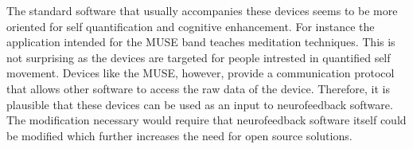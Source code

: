 The standard software that usually accompanies these devices seems to be more oriented for self quantification and cognitive enhancement. For instance the application intended for the MUSE band teaches meditation techniques. This is not surprising as the devices are targeted for people intrested in quantified self movement. Devices like the MUSE, however, provide a communication protocol that allows other software to access the raw data of the device. Therefore, it is plausible that these devices can be used as an input to neurofeedback software. The modification necessary would require that neurofeedback software itself could be modified which further increases the need for open source solutions.

